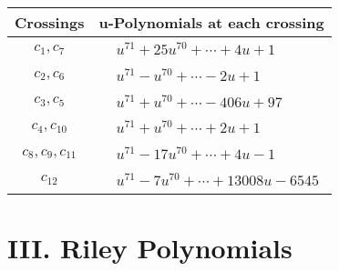 \documentclass[1p]{elsarticle_modified}
\theoremstyle{definition}
\begin{document}
\begin{tabular}{m{50pt}|m{274pt}}
Crossings & \hspace{64pt}u-Polynomials at each crossing \\
\hline $$\begin{aligned}c_{1},c_{7}\end{aligned}$$&$\begin{aligned}
&u^{71}+25 u^{70}+\cdots+4 u+1
\end{aligned}$\\
\hline $$\begin{aligned}c_{2},c_{6}\end{aligned}$$&$\begin{aligned}
&u^{71}- u^{70}+\cdots-2 u+1
\end{aligned}$\\
\hline $$\begin{aligned}c_{3},c_{5}\end{aligned}$$&$\begin{aligned}
&u^{71}+u^{70}+\cdots-406 u+97
\end{aligned}$\\
\hline $$\begin{aligned}c_{4},c_{10}\end{aligned}$$&$\begin{aligned}
&u^{71}+u^{70}+\cdots+2 u+1
\end{aligned}$\\
\hline $$\begin{aligned}c_{8},c_{9},c_{11}\end{aligned}$$&$\begin{aligned}
&u^{71}-17 u^{70}+\cdots+4 u-1
\end{aligned}$\\
\hline $$\begin{aligned}c_{12}\end{aligned}$$&$\begin{aligned}
&u^{71}-7 u^{70}+\cdots+13008 u-6545
\end{aligned}$\\
\hline
\end{tabular}\newpage\renewcommand{\arraystretch}{1}
\centering \section*{ III. Riley Polynomials}
\end{document}
